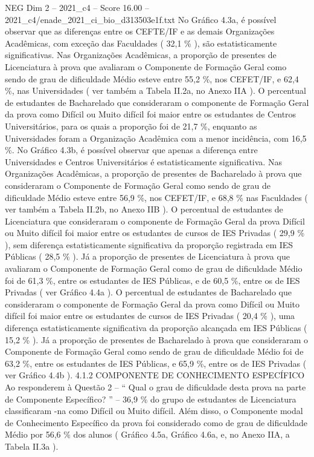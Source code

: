 \begin{textsample}{NEG Dim 2 – 2021\_c4 – Score 16.00 – 2021\_c4/enade\_2021\_ci\_bio\_d313503e1f.txt}
No Gráfico 4.3a, é possível observar que as diferenças entre os CEFTE/IF e as demais Organizações Acadêmicas, com exceção das Faculdades ( 32,1 \% ), são estatisticamente significativas.
Nas Organizações Acadêmicas, a proporção de presentes de Licenciatura à prova que avaliaram o Componente de Formação Geral como sendo de grau de dificuldade Médio esteve entre 55,2 \%, nos CEFET/IF, e 62,4 \%, nas Universidades ( ver também a Tabela II.2a, no Anexo IIA ).
O percentual de estudantes de Bacharelado que consideraram o componente de Formação Geral da prova como Difícil ou Muito difícil foi maior entre os estudantes de Centros Universitários, para os quais a proporção foi de 21,7 \%, enquanto as Universidades foram a Organização Acadêmica com a menor incidência, com 16,5 \%.
No Gráfico 4.3b, é possível observar que apenas a diferença entre Universidades e Centros Universitários é estatisticamente significativa.
Nas Organizações Acadêmicas, a proporção de presentes de Bacharelado à prova que consideraram o Componente de Formação Geral como sendo de grau de dificuldade Médio esteve entre 56,9 \%, nos CEFET/IF, e 68,8 \% nas Faculdades ( ver também a Tabela II.2b, no Anexo IIB ).
O percentual de estudantes de Licenciatura que consideraram o componente de Formação Geral da prova Difícil ou Muito difícil foi maior entre os estudantes de cursos de IES Privadas ( 29,9 \% ), sem diferença estatisticamente significativa da proporção registrada em IES Públicas ( 28,5 \% ).
Já a proporção de presentes de Licenciatura à prova que avaliaram o Componente de Formação Geral como de grau de dificuldade Médio foi de 61,3 \%, entre os estudantes de IES Públicas, e de 60,5 \%, entre os de IES Privadas ( ver Gráfico 4.4a ).
O percentual de estudantes de Bacharelado que consideraram o componente de Formação Geral da prova como Difícil ou Muito difícil foi maior entre os estudantes de cursos de IES Privadas ( 20,4 \% ), uma diferença estatisticamente significativa da proporção alcançada em IES Públicas ( 15,2 \% ).
Já a proporção de presentes de Bacharelado à prova que consideraram o Componente de Formação Geral como sendo de grau de dificuldade Médio foi de 63,2 \%, entre os estudantes de IES Públicas, e 65,9 \%, entre os de IES Privadas ( ver Gráfico 4.4b ). 4.1.2 COMPONENTE DE CONHECIMENTO ESPECÍFICO Ao responderem à Questão 2 – “ Qual o grau de dificuldade desta prova na parte de Componente Específico? ” – 36,9 \% do grupo de estudantes de Licenciatura classificaram -na como Difícil ou Muito difícil.
Além disso, o Componente modal de Conhecimento Específico da prova foi considerado como de grau de dificuldade Médio por 56,6 \% dos alunos ( Gráfico 4.5a, Gráfico 4.6a, e, no Anexo IIA, a Tabela II.3a ).

\end{textsample}
